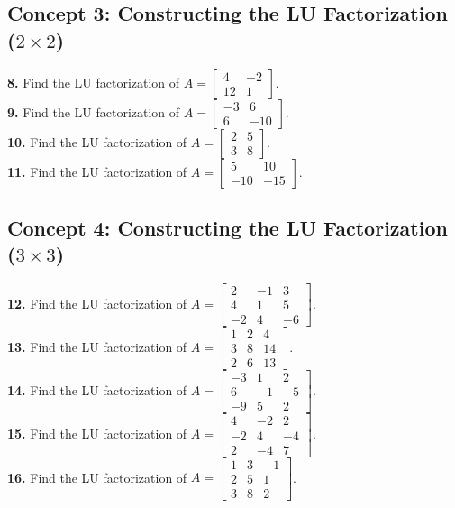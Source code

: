 \documentclass[11pt]{article}
\begin{document}
\subsection*{Concept 3: Constructing the LU Factorization ($2 \times 2$)}
\textbf{8.} Find the LU factorization of $A = \begin{bmatrix} 4 & -2 \\ 12 & 1 \end{bmatrix}$. \\
\textbf{9.} Find the LU factorization of $A = \begin{bmatrix} -3 & 6 \\ 6 & -10 \end{bmatrix}$. \\
\textbf{10.} Find the LU factorization of $A = \begin{bmatrix} 2 & 5 \\ 3 & 8 \end{bmatrix}$. \\
\textbf{11.} Find the LU factorization of $A = \begin{bmatrix} 5 & 10 \\ -10 & -15 \end{bmatrix}$.

\subsection*{Concept 4: Constructing the LU Factorization ($3 \times 3$)}
\textbf{12.} Find the LU factorization of $A = \begin{bmatrix} 2 & -1 & 3 \\ 4 & 1 & 5 \\ -2 & 4 & -6 \end{bmatrix}$. \\
\textbf{13.} Find the LU factorization of $A = \begin{bmatrix} 1 & 2 & 4 \\ 3 & 8 & 14 \\ 2 & 6 & 13 \end{bmatrix}$. \\
\textbf{14.} Find the LU factorization of $A = \begin{bmatrix} -3 & 1 & 2 \\ 6 & -1 & -5 \\ -9 & 5 & 2 \end{bmatrix}$. \\
\textbf{15.} Find the LU factorization of $A = \begin{bmatrix} 4 & -2 & 2 \\ -2 & 4 & -4 \\ 2 & -4 & 7 \end{bmatrix}$. \\
\textbf{16.} Find the LU factorization of $A = \begin{bmatrix} 1 & 3 & -1 \\ 2 & 5 & 1 \\ 3 & 8 & 2 \end{bmatrix}$.
\end{document}
